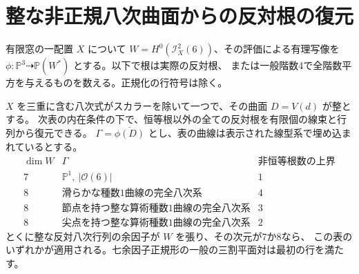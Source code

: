 \section{整な非正規八次曲面からの反対根の復元}
\label{sec:cofactor-curve-reconstruction}
有限窓の一配置 $X$ について $W=H^0(\mathcal I_X^2(6))$、その評価による有理写像を
$\phi:\mathbb P^3\dashrightarrow\mathbb P(W^*)$ とする。以下で根は実際の反対根、
または一般階数4で全階数平方を与えるものを数える。正規化の行符号は除く。
\begin{theorem}\label{thm:cofactor-curve-reconstruction}
$X$ を三重に含む八次式がスカラーを除いて一つで、その曲面 $D=V(d)$ が整とする。
次表の内在条件の下で、恒等根以外の全ての反対根を有限個の線束と行列から復元できる。
$\Gamma=\overline{\phi(D)}$ とし、表の曲線は表示された線型系で埋め込まれているとする。
\[
\begin{array}{c|l|c}
\dim W&\Gamma&\text{非恒等根数の上界}\\\hline
7&\mathbb P^1,\ |\mathcal O(6)|&1\\
8&\text{滑らかな種数1曲線の完全八次系}&4\\
8&\text{節点を持つ整な算術種数1曲線の完全八次系}&3\\
8&\text{尖点を持つ整な算術種数1曲線の完全八次系}&2
\end{array}
\]
とくに整な反対八次行列の余因子が $W$ を張り、その次元が7か8なら、
この表のいずれかが適用される。七余因子正規形の一般の三割平面対は最初の行を満たす。
\end{theorem}
